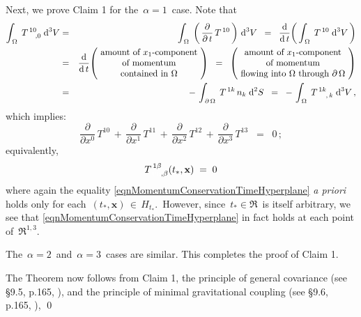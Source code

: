 \vskip 0.2cm
\noindent
Next, we prove Claim 1 for the \,$\alpha = 1$\, case. Note that
\begin{eqnarray*}
\int_{\,\Omega}\;T^{\,10}_{\,{\color{white}10},0}\;\d^{3}V
& = &
	\int_{\,\Omega}\;\left(\,\dfrac{\partial}{\partial\,t}\,T^{\,10}\,\right)\,\d^{3}V
\;\; = \;\;
	\dfrac{\d}{\d\,t}\!\left(\,\int_{\,\Omega}\;T^{\,10}\;\d^{3}V\,\right)
\\
&=&
\dfrac{\d}{\d\,t}\!\left(\!\begin{array}{c}
	\textnormal{amount of $x_{1}$-component}
	\\
	\textnormal{of momentum}
	\\
	\textnormal{contained in $\Omega$}
	\end{array}\!\right)
\;\; = \;\;
	\left(\!\begin{array}{c}
		\textnormal{amount of $x_{1}$-component}
		\\
		\textnormal{of momentum}
		\\
		\textnormal{flowing into $\Omega$ through $\partial\,\Omega$}
		\end{array}\!\right)
\\
&=&
	-\,\int_{\,\partial\,\Omega}\;T^{\,1k}\,n_{k}\;\d^{2}S
\;\; = \;\;
	-\,\int_{\,\Omega}\;T^{\,1k}_{\;{\color{white}0k},\,k}\;\d^{3}V\,,
\end{eqnarray*}
which implies:
\begin{equation*}
\dfrac{\partial}{\partial x^{0}}\,T^{10}
\,+\,
\dfrac{\partial}{\partial x^{1}}\,T^{11}
\,+\,
\dfrac{\partial}{\partial x^{2}}\,T^{12}
\,+\,
\dfrac{\partial}{\partial x^{3}}\,T^{13}
\;\; = \;\;
0\,;
\end{equation*}
equivalently,
\begin{equation}\label{eqnMomentumConservationTimeHyperplane}
T^{\,1\beta}_{\;{\color{white}0\beta},\beta}(t_{*},\mathbf{x}) \; = \; 0
\end{equation}
where again the equality \eqref{eqnMomentumConservationTimeHyperplane}
\textit{a priori} holds only for each \,$(t_{*},\mathbf{x}) \,\in\, H_{t_{*}}$.\,
However, since \,$t_{*} \in \Re$\, is itself arbitrary, we see that 
\eqref{eqnMomentumConservationTimeHyperplane} in fact holds at each point of \,$\Re^{1,3}$.\,

\vskip 0.2cm
\noindent
The \,$\alpha = 2$\, and \,$\alpha = 3$\, cases are similar.
This completes the proof of Claim 1.

\vskip 0.3cm
\noindent
The Theorem now follows from Claim 1,
the {\color{red}principle of general covariance} (see \S9.5, p.165, \cite{dInverno2021}),
and the {\color{red}principle of minimal gravitational coupling} (see \S9.6, p.165, \cite{dInverno2021}),
\qed



